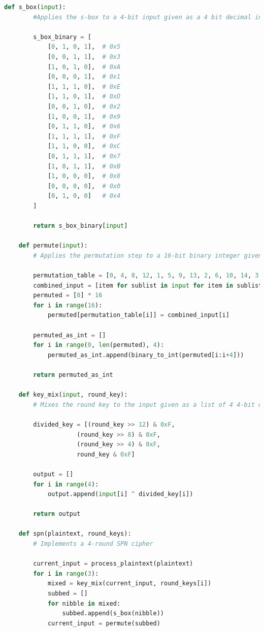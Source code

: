 \documentclass[letterpaper,12pt]{article}
\begin{document}
\begin{lstlisting}[language=Python, caption=Python code for SPN (spn.py), label=lts:spn]
    def s_box(input):
        #Applies the s-box to a 4-bit input given as a 4 bit decimal integer.

        s_box_binary = [
            [0, 1, 0, 1],  # 0x5
            [0, 0, 1, 1],  # 0x3
            [1, 0, 1, 0],  # 0xA
            [0, 0, 0, 1],  # 0x1
            [1, 1, 1, 0],  # 0xE
            [1, 1, 0, 1],  # 0xD
            [0, 0, 1, 0],  # 0x2
            [1, 0, 0, 1],  # 0x9
            [0, 1, 1, 0],  # 0x6
            [1, 1, 1, 1],  # 0xF
            [1, 1, 0, 0],  # 0xC
            [0, 1, 1, 1],  # 0x7
            [1, 0, 1, 1],  # 0xB
            [1, 0, 0, 0],  # 0x8
            [0, 0, 0, 0],  # 0x0
            [0, 1, 0, 0]   # 0x4
        ]

        return s_box_binary[input]

    def permute(input):
        # Applies the permutation step to a 16-bit binary integer given as input.

        permutation_table = [0, 4, 8, 12, 1, 5, 9, 13, 2, 6, 10, 14, 3, 7, 11, 15]
        combined_input = [item for sublist in input for item in sublist]
        permuted = [0] * 16
        for i in range(16):
            permuted[permutation_table[i]] = combined_input[i]
        
        permuted_as_int = []
        for i in range(0, len(permuted), 4):
            permuted_as_int.append(binary_to_int(permuted[i:i+4]))
        
        return permuted_as_int

    def key_mix(input, round_key):
        # Mixes the round key to the input given as a list of 4 4-bit decimal integers

        divided_key = [(round_key >> 12) & 0xF,
                    (round_key >> 8) & 0xF,
                    (round_key >> 4) & 0xF,
                    round_key & 0xF]
        
        output = []
        for i in range(4):
            output.append(input[i] ^ divided_key[i])
        
        return output

    def spn(plaintext, round_keys):
        # Implements a 4-round SPN cipher

        current_input = process_plaintext(plaintext)
        for i in range(3):
            mixed = key_mix(current_input, round_keys[i])
            subbed = []
            for nibble in mixed:
                subbed.append(s_box(nibble))
            current_input = permute(subbed)
        

\end{lstlisting}
\end{document}
